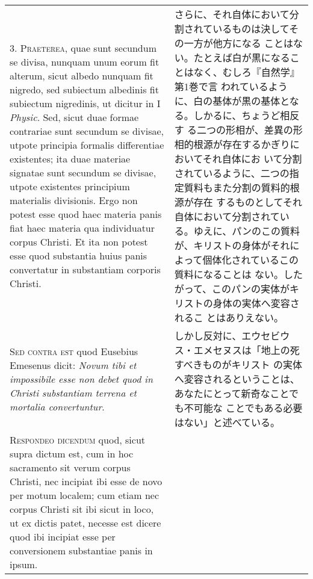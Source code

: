 \documentclass[10pt]{jsarticle} %
\begin{document}
\begin{longtable}{p{21em}p{21em}}
\\



3. {\scshape Praeterea}, quae sunt secundum se divisa, nunquam unum eorum fit
alterum, sicut albedo nunquam fit nigredo, sed subiectum albedinis fit
subiectum nigredinis, ut dicitur in I {\itshape Physic}. Sed, sicut duae formae
contrariae sunt secundum se divisae, utpote principia formalis
differentiae existentes; ita duae materiae signatae sunt secundum se
divisae, utpote existentes principium materialis divisionis. Ergo non
potest esse quod haec materia panis fiat haec materia qua individuatur
corpus Christi. Et ita non potest esse quod substantia huius panis
convertatur in substantiam corporis Christi.

&

さらに、それ自体において分割されているものは決してその一方が他方になる
 ことはない。たとえば白が黒になることはなく、むしろ『自然学』第1巻で言
 われているように、白の基体が黒の基体となる。しかるに、ちょうど相反す
 る二つの形相が、差異の形相的根源が存在するかぎりにおいてそれ自体にお
 いて分割されているように、二つの指定質料もまた分割の質料的根源が存在
 するものとしてそれ自体において分割されている。ゆえに、パンのこの質料
 が、キリストの身体がそれによって個体化されているこの質料になることは
 ない。したがって、このパンの実体がキリストの身体の実体へ変容されるこ
 とはありえない。



\\



{\scshape Sed contra est} quod Eusebius Emesenus dicit: {\itshape Novum tibi et impossibile
esse non debet quod in Christi substantiam terrena et mortalia
convertuntur}.

&

しかし反対に、エウセビウス・エメセヌスは「地上の死すべきものがキリスト
 の実体へ変容されるということは、あなたにとって新奇なことでも不可能な
 ことでもある必要はない」と述べている。

\\



{\scshape Respondeo dicendum} quod, sicut supra dictum est, cum in hoc sacramento
sit verum corpus Christi, nec incipiat ibi esse de novo per motum
localem; cum etiam nec corpus Christi sit ibi sicut in loco, ut ex
dictis patet, necesse est dicere quod ibi incipiat esse per
conversionem substantiae panis in ipsum. 


&


\end{longtable}
\end{document}
